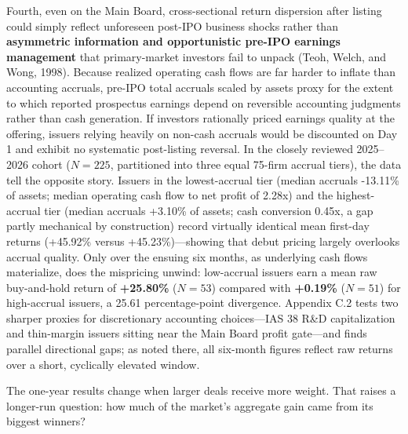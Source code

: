 \documentclass[11pt,letterpaper]{article}
\begin{document}
Fourth, even on the Main Board, cross-sectional return dispersion after listing could simply reflect unforeseen post-IPO business shocks rather than \textbf{asymmetric information and opportunistic pre-IPO earnings management} that primary-market investors fail to unpack (Teoh, Welch, and Wong, 1998). Because realized operating cash flows are far harder to inflate than accounting accruals, pre-IPO total accruals scaled by assets proxy for the extent to which reported prospectus earnings depend on reversible accounting judgments rather than cash generation. If investors rationally priced earnings quality at the offering, issuers relying heavily on non-cash accruals would be discounted on Day 1 and exhibit no systematic post-listing reversal. In the closely reviewed 2025–2026 cohort ($N = 225$, partitioned into three equal 75-firm accrual tiers), the data tell the opposite story. Issuers in the lowest-accrual tier (median accruals -13.11\% of assets; median operating cash flow to net profit of 2.28x) and the highest-accrual tier (median accruals +3.10\% of assets; cash conversion 0.45x, a gap partly mechanical by construction) record virtually identical mean first-day returns (+45.92\% versus +45.23\%)—showing that debut pricing largely overlooks accrual quality. Only over the ensuing six months, as underlying cash flows materialize, does the mispricing unwind: low-accrual issuers earn a mean raw buy-and-hold return of \textbf{+25.80\%} ($N = 53$) compared with \textbf{+0.19\%} ($N = 51$) for high-accrual issuers, a 25.61 percentage-point divergence. Appendix C.2 tests two sharper proxies for discretionary accounting choices—IAS 38 R\&D capitalization and thin-margin issuers sitting near the Main Board profit gate—and finds parallel directional gaps; as noted there, all six-month figures reflect raw returns over a short, cyclically elevated window.

The one-year results change when larger deals receive more weight. That raises a longer-run question: how much of the market’s aggregate gain came from its biggest winners?
\end{document}
